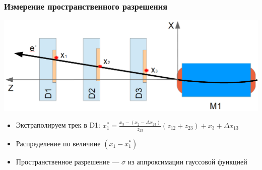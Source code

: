 \documentclass[14pt]{beamer}
\begin{document}


\begin{frame}[t]
\frametitle{Измерение пространственного разрешения}	\centering \includegraphics[width=0.7\linewidth]{reg_eff_exp_scheme.png}
		\small{\begin{itemize}
				\item Экстраполируем трек в D1: $\displaystyle x_{1}^{*} = \frac{x_3- (x_2 -\Delta x_{23}) }{z_{23}}(z_{12}+z_{23})+ x_3 + \Delta x_{13}$
				\item Распределение по величине $(x_1 - x_{1}^{*})$
				\item Пространственное разрешение --- $\sigma$ из аппроксимации гауссовой функцией
				\end{itemize}}
\end{frame}
\end{document}
